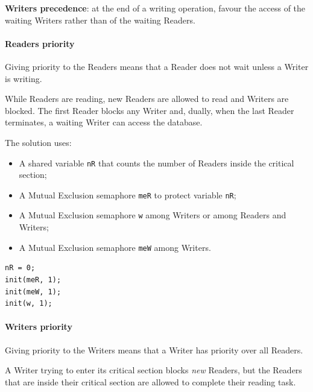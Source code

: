 \textbf{Writers precedence}: at the end of a writing operation, favour the access of the waiting Writers rather than of the waiting Readers.

\paragraph{Readers priority}
Giving priority to the Readers means that a Reader does not wait unless a Writer is writing.

While Readers are reading, new Readers are allowed to read and Writers are blocked. The first Reader blocks any Writer and, dually, when the last Reader terminates, a waiting Writer can access the database.

The solution uses:
\begin{itemize}
\item A shared variable \texttt{nR} that counts the number of Readers inside the critical section;
\item A Mutual Exclusion semaphore \texttt{meR} to protect variable \texttt{nR};
\item A Mutual Exclusion semaphore \texttt{w} among Writers or among Readers and Writers;
\item A Mutual Exclusion semaphore \texttt{meW} among Writers.
\end{itemize}

\begin{verbatim}
nR = 0;
init(meR, 1);
init(meW, 1);
init(w, 1);
\end{verbatim}

\begin{Parallel}{}{}
\end{Parallel}

\paragraph{Writers priority}
Giving priority to the Writers means that a Writer has priority over all Readers.

A Writer trying to enter its critical section blocks \emph{new} Readers, but the Readers that are inside their critical section are allowed to complete their reading task.

